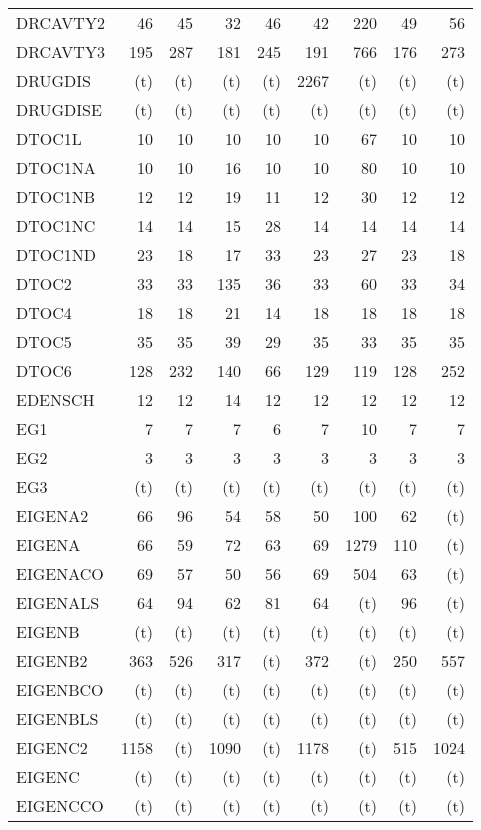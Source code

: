\documentclass[11pt,twoside]{article}
\begin{document}
{\begin{longtable}[c]{|l|r|r|r|r|r|r|r|r|}
 DRCAVTY2 & 46 & 45 & 32 & 46 & 42 & 220 & 49 & 56 \\
 DRCAVTY3 & 195 & 287 & 181 & 245 & 191 & 766 & 176 & 273 \\
 DRUGDIS & (t) & (t) & (t) & (t) & 2267 & (t) & (t) & (t) \\
 DRUGDISE & (t) & (t) & (t) & (t) & (t) & (t) & (t) & (t) \\
 DTOC1L & 10 & 10 & 10 & 10 & 10 & 67 & 10 & 10 \\
 DTOC1NA & 10 & 10 & 16 & 10 & 10 & 80 & 10 & 10 \\
 DTOC1NB & 12 & 12 & 19 & 11 & 12 & 30 & 12 & 12 \\
 DTOC1NC & 14 & 14 & 15 & 28 & 14 & 14 & 14 & 14 \\
 DTOC1ND & 23 & 18 & 17 & 33 & 23 & 27 & 23 & 18 \\
 DTOC2 & 33 & 33 & 135 & 36 & 33 & 60 & 33 & 34 \\
 DTOC4 & 18 & 18 & 21 & 14 & 18 & 18 & 18 & 18 \\
 DTOC5 & 35 & 35 & 39 & 29 & 35 & 33 & 35 & 35 \\
 DTOC6 & 128 & 232 & 140 & 66 & 129 & 119 & 128 & 252 \\
 EDENSCH & 12 & 12 & 14 & 12 & 12 & 12 & 12 & 12 \\
 EG1 & 7 & 7 & 7 & 6 & 7 & 10 & 7 & 7 \\
 EG2 & 3 & 3 & 3 & 3 & 3 & 3 & 3 & 3 \\
 EG3 & (t) & (t) & (t) & (t) & (t) & (t) & (t) & (t) \\
 EIGENA2 & 66 & 96 & 54 & 58 & 50 & 100 & 62 & (t) \\
 EIGENA & 66 & 59 & 72 & 63 & 69 & 1279 & 110 & (t) \\
 EIGENACO & 69 & 57 & 50 & 56 & 69 & 504 & 63 & (t) \\
 EIGENALS & 64 & 94 & 62 & 81 & 64 & (t) & 96 & (t) \\
 EIGENB & (t) & (t) & (t) & (t) & (t) & (t) & (t) & (t) \\
 EIGENB2 & 363 & 526 & 317 & (t) & 372 & (t) & 250 & 557 \\
 EIGENBCO & (t) & (t) & (t) & (t) & (t) & (t) & (t) & (t) \\
 EIGENBLS & (t) & (t) & (t) & (t) & (t) & (t) & (t) & (t) \\
 EIGENC2 & 1158 & (t) & 1090 & (t) & 1178 & (t) & 515 & 1024 \\
 EIGENC & (t) & (t) & (t) & (t) & (t) & (t) & (t) & (t) \\
 EIGENCCO & (t) & (t) & (t) & (t) & (t) & (t) & (t) & (t) \\

\end{longtable}}
\end{document}
